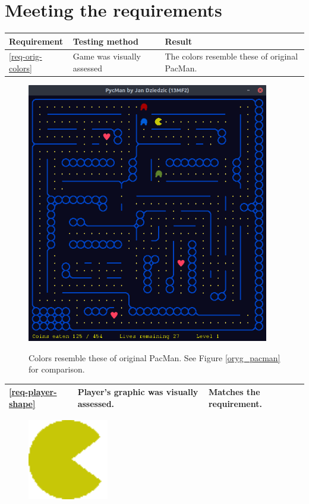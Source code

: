 \documentclass[11pt,a4paper,notitlepage]{report}
\newenvironment{img}{
	\begin{center}
		\begin{figure}[H]
			\begin{center}
			
}{
	\end{center}
		\end{figure}
			\end{center}
}
\begin{document}
		\section{Meeting the requirements}
			\begin{center}
				\begin{longtable}{ | p{2cm} | p{5cm} | p{4cm} |}
					\hline
					Requirement&Testing method&Result \\ \hline
					\ref{req-orig-colors}&Game was visually assessed&The colors resemble these of original PacMan. \\ \hline
				\end{longtable}
				\begin{img}
					\includegraphics[width=300pt]{images/ghosts-chasing0.png}\\
					\caption{Colors resemble these of original PacMan. See Figure \ref{oryg_pacman} for comparison.}
				\end{img}
				\begin{longtable}{ | p{2cm} | p{5cm} | p{4cm} |}
					\hline
					\ref{req-player-shape}&Player's graphic was visually assessed.&Matches the requirement. \\ \hline
				\end{longtable}
				\begin{img}
					\includegraphics[width=100pt]{images/player.png}\\

\end{img}
\end{center}
\end{document}
